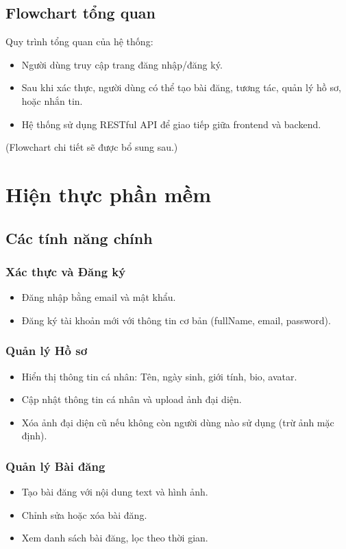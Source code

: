 \documentclass[a4paper,12pt]{article}
\begin{document}
	\subsection{Flowchart tổng quan}
	Quy trình tổng quan của hệ thống:
	\begin{itemize}
		\item Người dùng truy cập trang đăng nhập/đăng ký.
		\item Sau khi xác thực, người dùng có thể tạo bài đăng, tương tác, quản lý hồ sơ, hoặc nhắn tin.
		\item Hệ thống sử dụng RESTful API để giao tiếp giữa frontend và backend.
	\end{itemize}
	(Flowchart chi tiết sẽ được bổ sung sau.)
	
	\section{Hiện thực phần mềm}
	
	\subsection{Các tính năng chính}
	
	\subsubsection{Xác thực và Đăng ký}
	\begin{itemize}
		\item Đăng nhập bằng email và mật khẩu.
		\item Đăng ký tài khoản mới với thông tin cơ bản (fullName, email, password).
	\end{itemize}
	
	\subsubsection{Quản lý Hồ sơ}
	\begin{itemize}
		\item Hiển thị thông tin cá nhân: Tên, ngày sinh, giới tính, bio, avatar.
		\item Cập nhật thông tin cá nhân và upload ảnh đại diện.
		\item Xóa ảnh đại diện cũ nếu không còn người dùng nào sử dụng (trừ ảnh mặc định).
	\end{itemize}
	
	\subsubsection{Quản lý Bài đăng}
	\begin{itemize}
		\item Tạo bài đăng với nội dung text và hình ảnh.
		\item Chỉnh sửa hoặc xóa bài đăng.
		\item Xem danh sách bài đăng, lọc theo thời gian.
	\end{itemize}
	
\end{document}
